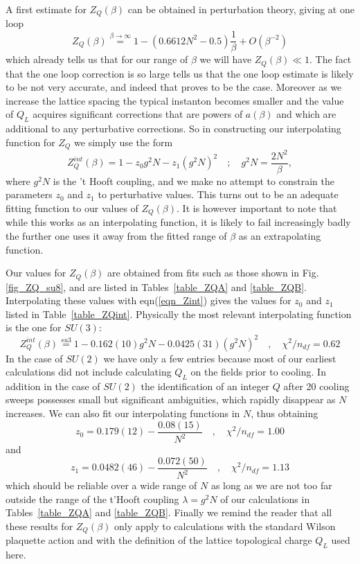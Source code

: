 \documentclass[12pt]{article}
\newcommand{\be}{\begin{equation}}
\newcommand{\ee}{\end{equation}}
\begin{document}
A first estimate for $Z_Q(\beta)$ can be obtained in perturbation theory, giving at one loop
%
\cite{Pisa_ZQ}
%
\be
Z_Q(\beta) \stackrel{\beta\to\infty}{=} 1 - (0.6612 N^2 - 0.5)\frac{1}{\beta} + O(\beta^{-2})
\label{eqn_Zpert}
\ee
%
which already tells us that for our range of $\beta$ we will have $Z_Q(\beta) \ll 1$. The
fact that the one loop correction is so large tells us that the one loop estimate is likely
to be not very accurate, and indeed that proves to be the case. Moreover as we increase the
lattice spacing the typical instanton becomes smaller and the value of $Q_L$ acquires
significant corrections that are powers of $a(\beta)$ and which are additional to any
perturbative corrections. So in constructing our interpolating function for $Z_Q$ we
simply use the form
%
\be
Z^{int}_Q(\beta) = 1 -  z_0 g^2N - z_1 (g^2N)^2 \quad ; \quad g^2N = \frac{2N^2}{\beta}, 
\label{eqn_Zint}
\ee
%
where $g^2N$ is the 't Hooft coupling, and we make no attempt 
to constrain the parameters $z_0$ and $z_1$ to perturbative values.
This turns out to be an adequate fitting function to our values of  $Z_Q(\beta)$. It
is however important to note that while this works as an interpolating function, it is
likely to fail increasingly badly the further one uses it away from the fitted range of $\beta$
as an extrapolating function.

Our values for $Z_Q(\beta)$ are obtained from fits such as those shown in Fig.\ref{fig_ZQ_su8},
and are listed in Tables~\ref{table_ZQA} and \ref{table_ZQB}.
Interpolating these values with eqn(\ref{eqn_Zint}) gives the values for $z_0$ and $z_1$ listed
in Table~\ref{table_ZQint}. Physically the most relevant interpolating function is the one
for $SU(3)$:
%
\be
Z^{int}_Q(\beta) \stackrel{su3}{=} 1 - 0.162(10)g^2N - 0.0425(31) (g^2N)^2 \quad , \quad \chi^2/n_{df} = 0.62
\label{eqn_Zintsu3}
\ee
%
In the case of $SU(2)$ we have only a few entries because most of our earliest calculations
did not include calculating $Q_L$ on the fields prior to cooling. In addition in the case
of $SU(2)$ the identification of an integer $Q$ after 20 cooling sweeps possesses small
but significant ambiguities, which rapidly disappear as $N$ increases. We can also
fit our interpolating functions in $N$, thus obtaining
%
\be
z_0 = 0.179(12) - \frac{0.08(15)}{N^2}   \quad , \quad \chi^2/n_{df} = 1.00
\label{eqn_Z0suN}
\ee
%
and
%
\be
z_1 = 0.0482(46) - \frac{0.072(50)}{N^2}   \quad , \quad \chi^2/n_{df} = 1.13
\label{eqn_Z1suN}
\ee
%
which should be reliable over a wide range of $N$ as long as we are not too far outside
the range of the t'Hooft coupling $\lambda=g^2N$ of our calculations in
Tables~\ref{table_ZQA} and \ref{table_ZQB}. Finally we remind the reader that all these
results for $Z_Q(\beta)$ only apply to calculations with the standard Wilson plaquette action
and with the definition of the lattice topological charge $Q_L$ used here.
\end{document}
